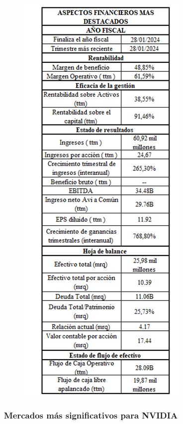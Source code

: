 \documentclass[letterpaper, 12pt]{article}
\begin{document}
\begin{figure}[H]
      \begin{center}
            \includegraphics[width=.5\linewidth]{./Images/Anexo2.png}
            \caption{}
      \end{center}
\end{figure}

\subsubsection*{Mercados más significativos para NVIDIA}
\end{document}
